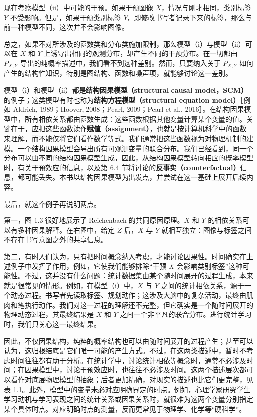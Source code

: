 

现在考察模型（ii）中可能的干预。如果干预图像 $X$，情况与刚才相同，类别标签 $Y$ 不受影响。但是，如果干预类别标签 $Y$，即修改书写者记录下来的标签，那么与前一种模型不同，这次并不会影响图像。

总之，如果不对所涉及的函数类和分布类施加限制，那么模型（i）与模型（ii）可以在 $X$ 和 $Y$ 上诱导出相同的观测分布，却产生不同的干预分布。在一切都由 $P_{X,Y}$ 导出的纯概率描述中，我们看不到这种差别。然而，只要纳入关于 $P_{X,Y}$ 如何产生的结构性知识，特别是图结构、函数和噪声项，就能够讨论这一差别。

模型（i）和模型（ii）都是\textbf{结构因果模型（structural causal model，SCM）}的例子；这类模型有时也称为\textbf{结构方程模型（structural equation model）}［例如 Aldrich, 1989；Hoover, 2008；Pearl, 2009；Pearl et al., 2016］。在结构因果模型中，所有相依关系都由函数生成：这些函数根据其他变量计算某个变量的值。关键在于，应把这些函数读作\textbf{赋值（assignment）}，也就是按计算机科学中的函数来理解，而不能仅将它们看作数学等式。我们通常把这些函数视为对物理机制的建模。一个结构因果模型会导出所有可观测变量的联合分布。我们已经看到，同一个分布可以由不同的结构因果模型生成，因此，从结构因果模型转向相应的概率模型时，有关干预效应的信息，以及第 6.4 节将讨论的\textbf{反事实（counterfactual）}信息，都可能丢失。本书以结构因果模型为出发点，并尝试在这一基础上展开后续内容。

最后，就这个例子再说明两点。

第一，图 1.3 很好地展示了 Reichenbach 的共同原因原理。$X$ 和 $Y$ 的相依关系可以有多种因果解释。在右图中，给定 $Z$ 后，$X$ 与 $Y$ 就相互独立：图像与标签之间不存在书写意图之外的共享信息。

第二，有时人们认为，只有把时间概念纳入考虑，才能讨论因果性。时间确实在上述例子中发挥了作用，例如，它使我们能够排除“干预 $X$ 会影响类别标签”这种可能性。不过，这并没有什么问题：统计数据集由某个随时间展开的过程生成，本来就是很常见的情形。例如，在模型（i）中，$X$ 与 $Y$ 之间的统计相依关系，源于一个动态过程。书写者先读取标签、规划动作；这涉及大脑中的复杂活动，最终由肌肉和笔执行动作。我们对这一过程的理解还不完整，但它确实是一个随时间展开的物理动态过程，其最终结果是 $X$ 和 $Y$ 之间一个非平凡的联合分布。进行统计学习时，我们只关心这一最终结果。

因此，不仅因果结构，纯粹的概率结构也可以由随时间展开的过程产生；甚至可以认为，这归根结底是它们唯一可能的产生方式。不过，在这两类描述中，暂时不考虑时间往往都有助于分析。在统计学中，讨论统计相依等概念时，通常不必涉及时间；在因果模型中，讨论干预效应时，也往往不必涉及时间。这两个描述层次都可以看作对底层物理模型的抽象；后者更加精确，对现实的描述也比它们更完整，见表 1.1。此外，模型中的变量未必对应明确界定的时点。例如，心理学家研究学生学习动机与学习表现之间的统计关系或因果关系时，就很难为这两个变量分别指定某个具体时点。对应明确时点的测量，反而更常见于物理学、化学等“硬科学”。

